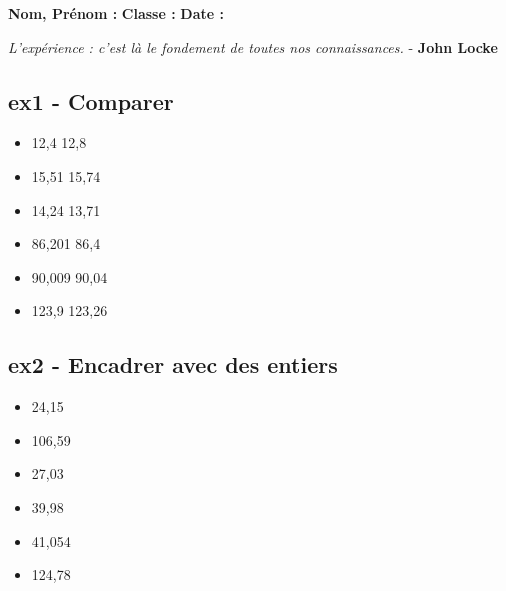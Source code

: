 



\textbf{Nom, Prénom :} \hspace{8cm} \textbf{Classe :} \hspace{3cm} \textbf{Date :}\\

\begin{center}
  \textit{L’expérience : c’est là le fondement de toutes nos connaissances.} - \textbf{John Locke}
\end{center}

\vspace{1cm}

\begin{multicols}{2} 

\subsection*{ex1 - Comparer}

\begin{itemize}[label={$\bullet$}]
  \item 12,4 \noindent\makebox[1cm]{\dotfill} 12,8
  \item 15,51 \noindent\makebox[1cm]{\dotfill} 15,74
  \item 14,24 \noindent\makebox[1cm]{\dotfill} 13,71
  \item 86,201 \noindent\makebox[1cm]{\dotfill} 86,4
  \item 90,009 \noindent\makebox[1cm]{\dotfill} 90,04
  \item 123,9 \noindent\makebox[1cm]{\dotfill} 123,26
\end{itemize} 

\subsection*{ex2 - Encadrer avec des entiers}

\begin{itemize}[label={$\bullet$}]
  \item \noindent\makebox[2cm]{\dotfill} 24,15 \noindent\makebox[2cm]{\dotfill}
  \item \noindent\makebox[2cm]{\dotfill} 106,59 \noindent\makebox[2cm]{\dotfill}
  \item \noindent\makebox[2cm]{\dotfill} 27,03 \noindent\makebox[2cm]{\dotfill}
  \item \noindent\makebox[2cm]{\dotfill} 39,98 \noindent\makebox[2cm]{\dotfill}
  \item \noindent\makebox[2cm]{\dotfill} 41,054 \noindent\makebox[2cm]{\dotfill}
  \item \noindent\makebox[2cm]{\dotfill} 124,78 \noindent\makebox[2cm]{\dotfill}
\end{itemize} 
\end{multicols}


